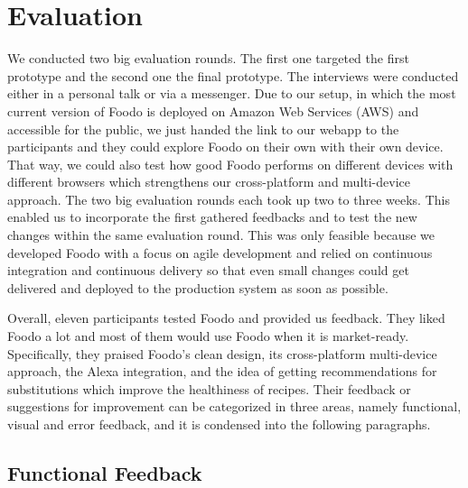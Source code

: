 \chapter{Evaluation}
We conducted two big evaluation rounds. The first one targeted the first prototype and the second one the final prototype. The interviews were conducted either in a personal talk or via a messenger. Due to our setup, in which the most current version of Foodo is deployed on Amazon Web Services (AWS) and accessible for the public, we just handed the link to our webapp to the participants and they could explore Foodo on their own with their own device. That way, we could also test how good Foodo performs on different devices with different browsers which strengthens our cross-platform and multi-device approach. The two big evaluation rounds each took up two to three weeks. This enabled us to incorporate the first gathered feedbacks and to test the new changes within the same evaluation round. This was only feasible because we developed Foodo with a focus on agile development and relied on continuous integration and continuous delivery so that even small changes could get delivered and deployed to the production system as soon as possible. 

Overall, eleven participants tested Foodo and provided us feedback. They liked Foodo a lot and most of them would use Foodo when it is market-ready. Specifically, they praised Foodo's clean design, its cross-platform multi-device approach, the Alexa integration, and the idea of getting recommendations for substitutions which improve the healthiness of recipes. Their feedback or suggestions for improvement can be categorized in three areas, namely functional, visual and error feedback, and it is condensed into the following paragraphs.

\section{Functional Feedback}


